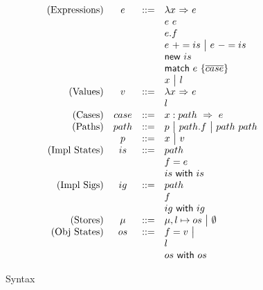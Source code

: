 \begin{figure*}
\[
\begin{array}{r c c l}
    \mbox{(Expressions)} & e & ::= &
        \lambda x \  {\Rightarrow} \ e \\
    & & &
       e \ e \\
    & & &
        e.f \\ 
    & & &
        e \ += is ~\big{|}~ e \ -= is \\
    & & &
    	\textsf{new} \ is \\
    & & &
    	\textsf{match} \ e \ \{\overline{case}\} \\
    & & &
    	x ~\big{|}~ l \\
    \mbox{(Values)} & v & ::= &
    	\lambda x \  {\Rightarrow} \ e \\
        & & &
        l \\
    \mbox{(Cases)} & case & ::= &
    	x : path \ \Rightarrow \ e \\
    \mbox{(Paths)} & path & ::= &
    	p ~\big{|}~ path.f ~\big{|}~ path \ path \\
    \mbox{} & p & ::= &
    	x ~\big{|}~ v \\
    \mbox{(Impl States)} & is & ::= &
    	path \\
    & & & 
	f = e \\
    & & &
	is\ \textsf{with} \ is \\
    \mbox{(Impl Sigs)} & ig & ::= &
    	path \\
    & & &
	f \\
    & & &
	ig\ \textsf{with} \ ig \\
    \mbox{(Stores)} & \mu & ::= &
    	\mu, l \mapsto os ~\big{|}~
	\emptyset \\
    \mbox{(Obj States)} & os & ::= &
        f=v ~\big{|}~ \\
    & & &
        l \\
    & & &
        os\ \textsf{with} \ os\\
\end{array}
\]
\caption{Syntax}
\label{fig:syntax}
\end{figure*}

